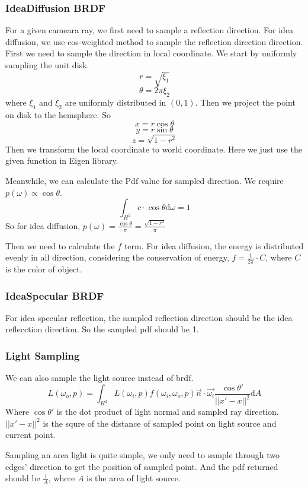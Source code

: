 \documentclass[acmtog]{acmart}
\begin{document}
\subsubsection{IdeaDiffusion BRDF}
For a given cameara ray, we first need to sample a reflection direction.
For idea diffusion, we use cos-weighted method to sample the reflection direction direction. First we need to sample the direction in local coordinate. We start by uniformly sampling the unit disk.
\[r = \sqrt{\xi_1}\]
\[\theta = 2\pi \xi_2\]
where $\xi_1$ and $\xi_2$ are uniformly distributed in $(0,1)$. Then we project the point on disk to the hemsphere. So
\[x = r \cos \theta\]
\[y = r \sin \theta\]
\[z = \sqrt{1 - r^2}\]
Then we transform the local coordinate to world coordinate. Here we just use the given function in Eigen library.

Meanwhile, we can calculate the Pdf value for sampled direction. We require $p(\omega) \propto \cos \theta$.
\[
  \int_{H^2} c\cdot \cos \theta \mathrm{d}\omega = 1
\]
So for idea diffusion, $p(\omega) = \frac{\cos \theta}{\pi} = \frac{\sqrt{1-r^2}}{\pi}$

Then we need to calculate the $f$ term. For idea diffusion, the energy is distributed evenly in all direction, considering the conservation of energy, $f = \frac{1}{2\pi} \cdot C$, where $C$ is the color of object.

\subsubsection{IdeaSpecular BRDF}
For idea specular reflection, the sampled reflection direction should be the idea reflecction direction. So the sampled pdf should be 1.

\subsubsection{Light Sampling}
We can also sample the light source instead of brdf.
\[L(\omega_o, p) = \int_{H^2} L(\omega_i, p) f(\omega_i, \omega_o, p) \vec{n}\cdot \vec{\omega_i} \frac{\cos \theta'}{||x'-x||^2} \mathrm{d}A\]
Where $\cos \theta'$ is the dot product of light normal and sampled ray direction. $||x'-x||^2$ is the squre of the distance of sampled point on light source and current point.

Sampling an area light is quite simple, we only need to sample through two edges' direction to get the position of sampled point. And the pdf returned should be $\frac{1}{A}$, where $A$ is the area of light source.
\end{document}
